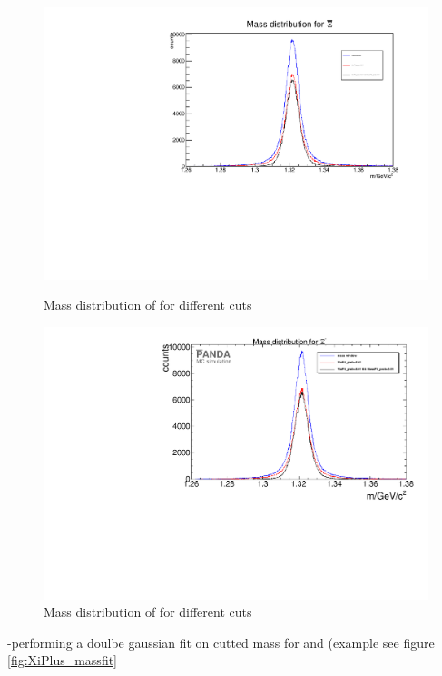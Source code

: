 		\begin{figure}
			\centering
				\includegraphics[width=1.1\textwidth]{./plots/Xi/XiPlus_m_diffcuts.pdf}
			\caption{Mass distribution of \anticascade for different cuts}
			\label{fig:XiPlus_massdiffcuts}
			
				\includegraphics[width=1.1\textwidth]{./plots/Xi/XiMinus_m_diffcuts.pdf}
			\caption{Mass distribution of \cascade for different cuts}
			\label{fig:XiMinus_massdiffcuts}
		\end{figure}
		
		-performing a doulbe gaussian fit on cutted mass for \anticascade and \cascade (example see figure \ref{fig:XiPlus_massfit}
		
